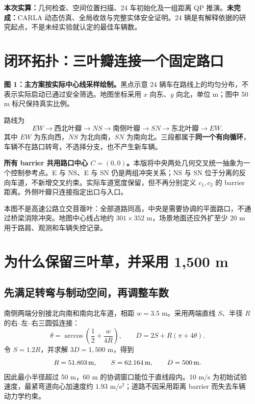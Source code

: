 \documentclass[UTF8,fontset=fandol,11pt,a4paper]{ctexart}
\newcommand{\unit}[1]{\,\mathrm{#1}}\newcommand{\nom}{\mathrm{nom}}
\newcommand{\page}[1]{\clearpage\section{#1}}
\begin{document}
\textbf{本次实算：}几何检查、空间位置扫描、24 车初始化及一组距离 QP 推演。\textbf{未完成：}CARLA 动态仿真、全局收敛与完整实体安全证明。24 辆是有解释依据的研究起点，不是未经实验就认定的最佳车辆数。
\page{闭环拓扑：三叶瓣连接一个固定路口}
\begin{center}\end{center}
\textbf{图 1：主方案按实际中心线采样绘制。}黑点示意 24 辆车在路线上的均匀分布，不表示实际启动已通过安全筛选。地图坐标采用 $x$ 向东、$y$ 向北，单位 m；图中 50 m 标尺保持真实比例。

路线为
\[
EW\longrightarrow\text{西北叶瓣}\longrightarrow NS
\longrightarrow\text{南侧叶瓣}\longrightarrow SN
\longrightarrow\text{东北叶瓣}\longrightarrow EW.
\]
其中 $EW$ 为东向西，$NS$ 为北向南，$SN$ 为南向北。三段都属于\textbf{同一个有向循环}，车辆不在路口转弯，不选择分支，也不产生新车辆。

\textbf{所有 barrier 共用路口中心 $C=(0,0)$。}本版将中央两处几何交叉统一抽象为一个控制参考点。E 与 NS、E 与 SN 仍是两组冲突关系；NS 与 SN 位于分离的反向车道，不新增交叉约束。实际车道宽度保留，但不再分别定义 $c_1,c_2$ 的 barrier 距离。外侧叶瓣只连接指定出口与入口。

本图不是高速公路立交苜蓿叶：全部道路同高，中央是需要协调的平面路口，不通过桥梁消除冲突。地图中心线占地约 $301\times352$ m，场景地面还应外扩至少 20 m 用于路肩、观测和车辆失控记录。

\page{为什么保留三叶草，并采用 1,500 m}
\subsection{先满足转弯与制动空间，再调整车数}
南侧两端分别接北向南和南向北车道，相距 $w=3.5$ m。采用两端直线 $S$、半径 $R$ 的右--左--右三圆弧连接：
\[
\theta=\arccos\!\left(\frac12+\frac{w}{4R}\right),\qquad
D=2S+R(\pi+4\theta).
\]
令 $S=1.2R$，并求解 $3D=1,500$ m，得到
\[
R=\SouthRadius\unit{m},\qquad S=\SouthStraight\unit{m},\qquad D=500\unit{m}.
\]
因此最小半径超过 50 m，60 m 的协调窗口能位于直线段内。10 m/s 为初始试验速度，最紧弯道向心加速度约 $1.93$ m/s$^2$；道路不因采用距离 barrier 而失去车辆动力学约束。
\end{document}
